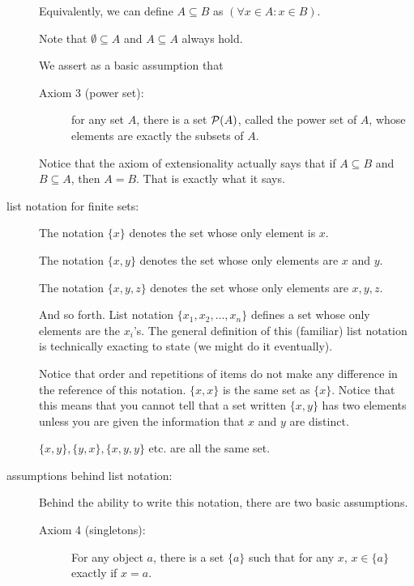 \documentclass[12pt]{article}
\begin{document}
\begin{description}
Equivalently, we can define $A \subseteq B$ as $(\forall x \in A: x\in B)$.

Note that $\emptyset \subseteq A$ and $A \subseteq A$ always hold.

We assert as a basic assumption that 

\begin{description}

\item[Axiom 3 (power set):]  for any set $A$, there is a set ${\cal P}(A)$, called the power set of $A$, whose elements are exactly the subsets of $A$.

\end{description}

Notice that the axiom of extensionality actually says that if $A \subseteq B$ and $B \subseteq A$, then $A = B$.   That is exactly what it says.


\item[list notation for finite sets:]  The notation $\{x\}$ denotes the set whose only element is $x$.

The notation $\{x,y\}$ denotes the set whose only elements are $x$ and $y$.

The notation $\{x,y,z\}$ denotes the set whose only elements are $x,y,z$.

And so forth.  List notation $\{x_1,x_2,\ldots,x_n\}$ defines a set whose only elements are the $x_i$'s.
The general definition of this (familiar) list notation is technically exacting to state (we might do it eventually).

Notice that order and repetitions of items do not make any difference in the reference of this notation.
$\{x,x\}$ is the same set as $\{x\}$.  Notice that this means that you cannot tell that a set written $\{x,y\}$ has two elements unless you are given the information that $x$ and $y$ are distinct.

$\{x,y\}, \{y,x\}, \{x,y,y\}$ etc. are all the same set.

\item[assumptions behind list notation:]

Behind the ability to write this notation, there are two basic assumptions.

\begin{description}

\item[Axiom 4 (singletons):]  For any object $a$, there is a set $\{a\}$ such that for any $x$, $x \in \{a\}$ exactly if $x=a$.

\end{description}


\end{description}
\end{document}
